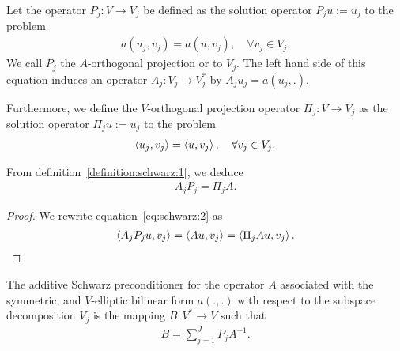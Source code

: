 \begin{definition}
  \label{definition:schwarz:1}
  Let the operator $P_j: V \to V_j$ be defined as the solution
  operator $P_j u := u_j$ to the problem
  \begin{gather}
    \label{eq:schwarz:2}
    a(u_j,v_j) = a(u,v_j),\quad\forall v_j\in V_j.
  \end{gather}
  We call $P_j$ the $A$-orthogonal projection or  to
  $V_j$. The left hand side of this equation induces an operator $A_j:
  V_j \to V_j^*$ by $A_j u_j = a(u_j,.)$.

 Furthermore, we define the $V$-orthogonal projection operator
  $\Pi_j: V \to V_j$ as the solution operator $\Pi_j u := u_j$ to the problem
  \begin{gather}
    \label{eq:schwarz:3}
    \scal(u_j,v_j) = \scal(u,v_j),\quad\forall v_j\in V_j.
  \end{gather}
\end{definition}

\begin{lemma}
  \label{lemma:schwarz:2}  
  From definition~\ref{definition:schwarz:1}, we deduce
  \begin{gather}
    \label{eq:schwarz:15}
    A_j P_j = \Pi_j A.
  \end{gather}
\end{lemma}

\begin{proof}
  We rewrite equation~\eqref{eq:schwarz:2} as
  \begin{gather}
    \scal(A_j P_j u, v_j) = \scal(A u, v_j) = \scal(\Pi_j A u, v_j).
  \end{gather}
\end{proof}

\begin{definition}
  The additive Schwarz preconditioner for the operator $A$ associated
  with the symmetric, and $V$-elliptic bilinear form $a(.,.)$ with
  respect to the subspace decomposition $V_j$ is the mapping $B:
  V^*\to V$ such that
  \begin{gather}
    \label{eq:schwarz:4}
    B = \sum_{j=1}^J P_j A^{-1}.
  \end{gather}
\end{definition}


